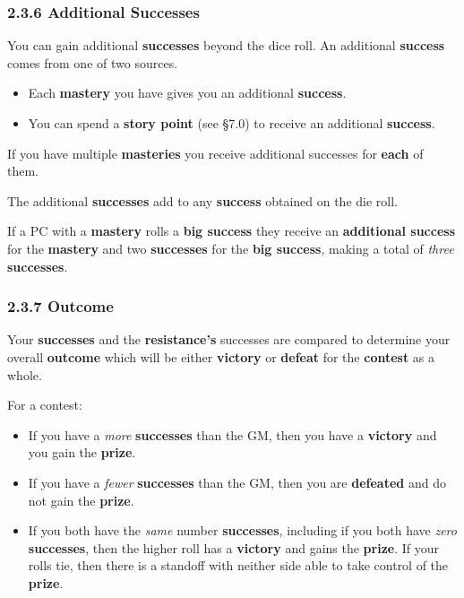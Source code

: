 \documentclass[
  11pt,
]{article}
\providecommand{\tightlist}{%
  \setlength{\itemsep}{0pt}\setlength{\parskip}{0pt}}
\begin{document}
\hypertarget{additional-successes}{%
\subsubsection{2.3.6 Additional Successes}\label{additional-successes}}

You can gain additional \textbf{successes} beyond the dice roll. An
additional \textbf{success} comes from one of two sources.

\begin{itemize}
\tightlist
\item
  Each \textbf{mastery} you have gives you an additional
  \textbf{success}.
\item
  You can spend a \textbf{story point} (see §7.0) to receive an
  additional \textbf{success}.
\end{itemize}

If you have multiple \textbf{masteries} you receive additional successes
for \textbf{each} of them.

The additional \textbf{successes} add to any \textbf{success} obtained
on the die roll.

If a PC with a \textbf{mastery} rolls a \textbf{big success} they
receive an \textbf{additional success} for the \textbf{mastery} and two
\textbf{successes} for the \textbf{big success}, making a total of
\emph{three} \textbf{successes}.

\hypertarget{outcome}{%
\subsubsection{2.3.7 Outcome}\label{outcome}}

Your \textbf{successes} and the \textbf{resistance's} successes are
compared to determine your overall \textbf{outcome} which will be either
\textbf{victory} or \textbf{defeat} for the \textbf{contest} as a whole.

For a contest:

\begin{itemize}
\tightlist
\item
  If you have a \emph{more} \textbf{successes} than the GM, then you
  have a \textbf{victory} and you gain the \textbf{prize}.
\item
  If you have a \emph{fewer} \textbf{successes} than the GM, then you
  are \textbf{defeated} and do not gain the \textbf{prize}.
\item
  If you both have the \emph{same} number \textbf{successes}, including
  if you both have \emph{zero} \textbf{successes}, then the higher roll
  has a \textbf{victory} and gains the \textbf{prize}. If your rolls
  tie, then there is a standoff with neither side able to take control
  of the \textbf{prize}.
\end{itemize}
\end{document}
